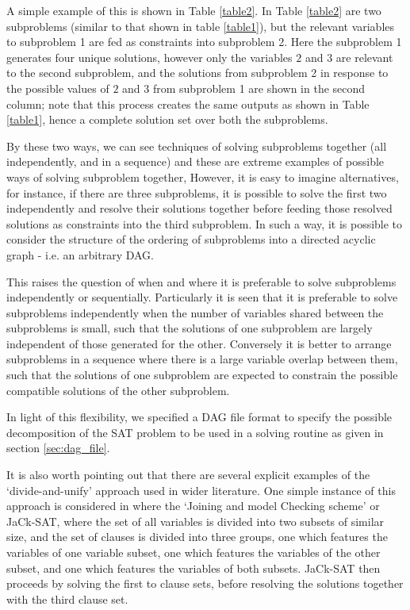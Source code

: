 \documentclass[
10pt, %
a4paper, %
oneside, %
headinclude,footinclude, %
BCOR5mm, %
]{scrartcl}
\begin{document}
A simple example of this is shown in Table \ref{table2}. In Table \ref{table2} are two subproblems (similar to that shown in table \ref{table1}), 
but the relevant variables to subproblem 1 are fed as constraints into subproblem 2.
Here the subproblem 1 generates four unique solutions, however only the variables $2$ and $3$ are relevant to the second subproblem, and the solutions from subproblem 2 in response to the possible values of $2$ and $3$ from subproblem 1 are shown in the second column; note that this process creates the same outputs as shown in Table \ref{table1}, hence a complete solution set over both the subproblems.

By these two ways, we can see techniques of solving subproblems together (all independently, and in a sequence) and these are extreme examples of possible ways of solving subproblem together,
However, it is easy to imagine alternatives, for instance, if there are three subproblems, it is possible to solve the first two independently and resolve their solutions together 
before feeding those resolved solutions as constraints into the third subproblem.
In such a way, it is possible to consider the structure of the ordering of subproblems into a directed acyclic graph - i.e. an arbitrary DAG.

This raises the question of when and where it is preferable to solve subproblems independently or sequentially.
Particularly it is seen that it is preferable to solve subproblems independently when the number of variables shared between the subproblems is small, such that the solutions of one subproblem are largely independent of those generated for the other.
Conversely it is better to arrange subproblems in a sequence where there is a large variable overlap between them, such that the solutions of one subproblem are expected to constrain the possible compatible solutions of the other subproblem.

In light of this flexibility, we specified a DAG file format to specify the possible decomposition of the SAT problem to be used in a solving routine as given in section \ref{sec:dag_file}.

It is also worth pointing out that there are several explicit examples of the `divide-and-unify' approach used in wider literature. 
One simple instance of this approach is considered in \cite{DBLP:conf/ppam/SingerM07} where the `Joining and model Checking scheme' or JaCk-SAT, where the set of all variables is divided into two subsets of similar size, and the set of clauses is divided into three groups, one which features the variables of one variable subset, one which features the variables of the other subset, and one which features the variables of both subsets.
JaCk-SAT then proceeds by solving the first to clause sets, before resolving the solutions together with the third clause set.
\end{document}
